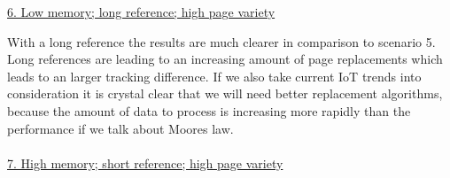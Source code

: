 \documentclass[12pt, reqno]{amsart}
\numberwithin{equation}{section}
\begin{document}
\underline{6. Low memory; long reference; high page variety} \\
\begin{center}
\end{center}

With a long reference the results are much clearer in comparison to scenario 5. Long references are leading to an increasing amount of page replacements which
leads to an larger tracking difference. If we also take current IoT trends into consideration it is crystal clear that we will need better replacement algorithms, 
because the amount of data to process is increasing more rapidly than the performance if we talk about Moores law. \\ \\

\underline{7. High memory; short reference; high page variety} \\
\begin{center}
\end{center}
\end{document}
